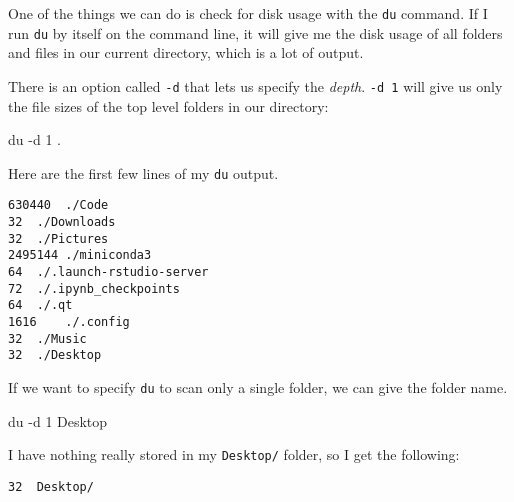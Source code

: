 \documentclass[
  letterpaper,
  DIV=11,
  numbers=noendperiod]{scrreprt}
\newenvironment{Shaded}{\begin{snugshade}}{\end{snugshade}}
\newcommand{\AttributeTok}[1]{\textcolor[rgb]{0.40,0.45,0.13}{#1}}
\newcommand{\FunctionTok}[1]{\textcolor[rgb]{0.28,0.35,0.67}{#1}}
\newcommand{\NormalTok}[1]{\textcolor[rgb]{0.00,0.23,0.31}{#1}}
\begin{document}
One of the things we can do is check for disk usage with the \texttt{du}
command. If I run \texttt{du} by itself on the command line, it will
give me the disk usage of all folders and files in our current
directory, which is a lot of output.

There is an option called \texttt{-d} that lets us specify the
\emph{depth}. \texttt{-d\ 1} will give us only the file sizes of the top
level folders in our directory:

\begin{Shaded}
\begin{Highlighting}[]
\FunctionTok{du} \AttributeTok{{-}d}\NormalTok{ 1 .}
\end{Highlighting}
\end{Shaded}

Here are the first few lines of my \texttt{du} output.

\begin{verbatim}
630440  ./Code
32  ./Downloads
32  ./Pictures
2495144 ./miniconda3
64  ./.launch-rstudio-server
72  ./.ipynb_checkpoints
64  ./.qt
1616    ./.config
32  ./Music
32  ./Desktop
\end{verbatim}

If we want to specify \texttt{du} to scan only a single folder, we can
give the folder name.

\begin{Shaded}
\begin{Highlighting}[]
\FunctionTok{du} \AttributeTok{{-}d}\NormalTok{ 1 Desktop}
\end{Highlighting}
\end{Shaded}

I have nothing really stored in my \texttt{Desktop/} folder, so I get
the following:

\begin{verbatim}
32  Desktop/
\end{verbatim}
\end{document}

